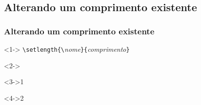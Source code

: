 \documentclass[handout,10pt]{beamer}
\begin{document}
\subsection{Alterando um comprimento existente}
\begin{frame}[fragile]
	\frametitle{Alterando um comprimento existente}
	
	\begin{block}<1->{}
		\centering
		\verb|\setlength{\|\textit{nome}\verb|}{|\textit{comprimento}\verb|}|
	\end{block}
	
	
	\begin{uncoverenv}<2->
		\begin{center}
			\usebox{\minhacaixa}
		\end{center}
	\end{uncoverenv}
	
	
	\begin{atividade}<3->{1}
		\begin{LaTeXcode}
			\setlength{\parindent}{2cm}
		\end{LaTeXcode}
	\end{atividade}
	
	\vspace*{\stretch{1}}
	
	\begin{atividade}<4->{2}
		\begin{LaTeXcode}
			\setlength{\baselineskip}{-24pt}
			\setlength{\lineskip}{-24pt}
		\end{LaTeXcode}
	\end{atividade}
\end{frame}
\end{document}
